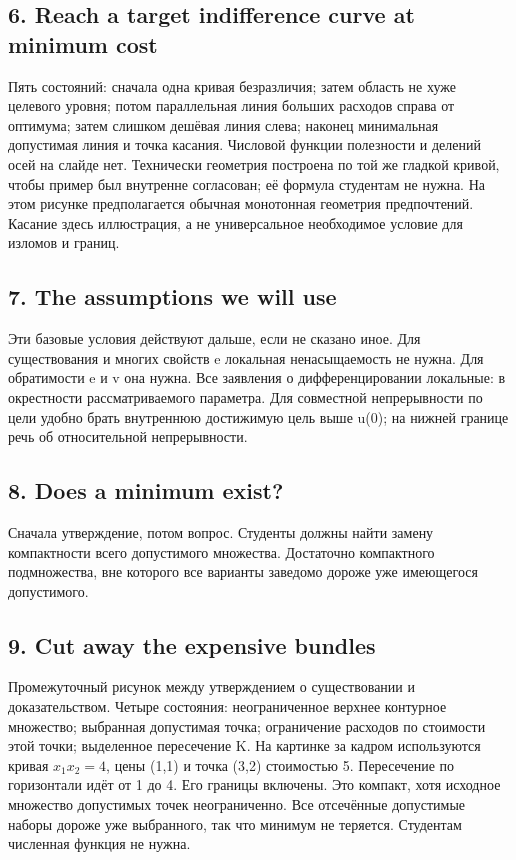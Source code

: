 \documentclass[11pt,a4paper]{article}
\begin{document}
\subsection*{6. Reach a target indifference curve at minimum cost}
Пять состояний: сначала одна кривая безразличия; затем область не хуже целевого уровня; потом параллельная линия больших расходов справа от оптимума; затем слишком дешёвая линия слева; наконец минимальная допустимая линия и точка касания. Числовой функции полезности и делений осей на слайде нет. Технически геометрия построена по той же гладкой кривой, чтобы пример был внутренне согласован; её формула студентам не нужна. На этом рисунке предполагается обычная монотонная геометрия предпочтений. Касание здесь иллюстрация, а не универсальное необходимое условие для изломов и границ.

\subsection*{7. The assumptions we will use}
Эти базовые условия действуют дальше, если не сказано иное. Для существования и многих свойств e локальная ненасыщаемость не нужна. Для обратимости e и v она нужна. Все заявления о дифференцировании локальные: в окрестности рассматриваемого параметра. Для совместной непрерывности по цели удобно брать внутреннюю достижимую цель выше u(0); на нижней границе речь об относительной непрерывности.

\subsection*{8. Does a minimum exist?}
Сначала утверждение, потом вопрос. Студенты должны найти замену компактности всего допустимого множества. Достаточно компактного подмножества, вне которого все варианты заведомо дороже уже имеющегося допустимого.

\subsection*{9. Cut away the expensive bundles}
Промежуточный рисунок между утверждением о существовании и доказательством. Четыре состояния: неограниченное верхнее контурное множество; выбранная допустимая точка; ограничение расходов по стоимости этой точки; выделенное пересечение K. На картинке за кадром используются кривая $x_1x_2=4$, цены (1,1) и точка (3,2) стоимостью 5. Пересечение по горизонтали идёт от 1 до 4. Его границы включены. Это компакт, хотя исходное множество допустимых точек неограниченно. Все отсечённые допустимые наборы дороже уже выбранного, так что минимум не теряется. Студентам численная функция не нужна.
\end{document}
